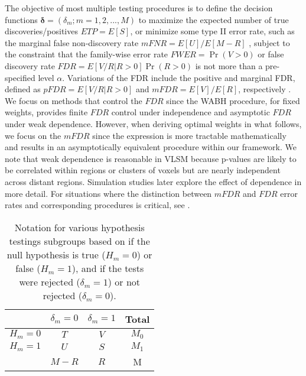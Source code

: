 \documentclass[bimj,fleqn]{w-art}
\theoremstyle{plain}
\theoremstyle{definition}
\begin{document}
The objective of most multiple testing procedures is to define the decision functions $\mathbf{\delta} = (\delta_m; m = 1, 2, ..., M)$ to maximize the expected number of true discoveries/positives $ETP = E[S]$, or minimize some type II error rate, such as the marginal false non-discovery rate $mFNR = {E[U]/E[M-R]}$ \citep{Sun2007}, subject to the constraint that the family-wise error rate $FWER = \Pr(V>0)$ or false discovery rate $FDR = E\left[V/R|R>0\right]\Pr(R>0)$ is not more than a pre-specified level $\alpha$. Variations of the FDR include the positive and marginal FDR, defined as $pFDR = E\left[V/R|R>0\right]$ and $mFDR = E[V]/E[R]$, respectively \citep{Storey2003}. We focus on methods that control the $FDR$ since the WABH procedure, for fixed weights, provides finite $FDR$ control under independence and asymptotic $FDR$ under weak dependence.  However, when deriving optimal weights in what follows, we focus on the $mFDR$ since the expression is more tractable mathematically \citep{CaiSun17} and results in an asymptotically equivalent procedure within our framework.  We note that weak dependence is reasonable in VLSM because p-values are likely to be correlated within regions or clusters of voxels but are nearly independent across distant regions. Simulation studies later explore the effect of dependence in more detail. For situations where the distinction between $mFDR$ and $FDR$ error rates and corresponding procedures is critical, see \cite{heller2021optimal}.

\begin{table}[b]\center
\caption{\label{BHtable} Notation for various hypothesis testings subgroups based on if the null hypothesis is true ($H_m = 0$) or false ($H_m = 1$), and if the tests were rejected ($\delta_m = 1$) or not rejected ($\delta_m = 0$).}
\begin{tabular}{c|cc|c} \hline\hline
& $\delta_m = 0$ & $\delta_m = 1$ & Total \\ \hline
$H_m = 0$ & $T$ & $V$ & $M_0$ \\
$H_m = 1$ & $U$ & $S$ & $M_1$ \\ \hline
&$M - R$ & $R$ & M \\
\end{tabular}
\end{table}
\end{document}
